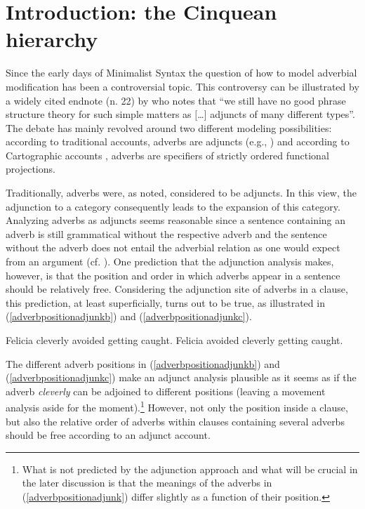 \section{Introduction: the Cinquean hierarchy}\label{introcinque}
Since the early days of Minimalist Syntax the question of how to model adverbial modification has been a controversial topic. This controversy can be illustrated by a widely cited endnote (n. 22) by \citet[382]{chomsky1995categories} who notes that ``we still have no good phrase structure theory for such simple matters as $[$\dots $]$ adjuncts of many different types''. The debate has mainly revolved around two different modeling possibilities: according to traditional accounts, adverbs are adjuncts (e.g., \citealt{travis1988syntax, potsdam1999syntax, ernst2004principles, vanvalin2005exploring}) and according to Cartographic accounts \citep{cinque1999adverbs, cinque2006restructuring}, adverbs are specifiers of strictly ordered functional projections. 

Traditionally, adverbs were, as noted, considered to be adjuncts. In this view, the adjunction to a category consequently leads to the expansion of this category. Analyzing adverbs as adjuncts seems reasonable since a sentence containing an adverb is still grammatical without the respective adverb and the sentence without the adverb does not entail the adverbial relation as one would expect from an argument (cf.  \citealt{hole2015arguments}).  One prediction that the adjunction analysis makes, however, is that the position and order in which adverbs appear in a sentence should be relatively free. Considering the adjunction site of adverbs in a clause, this prediction, at least superficially, turns out to be true, as illustrated in (\ref{adverbpositionadjunkb}) and (\ref{adverbpositionadjunkc}).

\begin{exe} 
\ex \label{adverbpositionadjunk}\begin{xlist} 
\ex Felicia cleverly avoided getting caught. \label{adverbpositionadjunkb} %
\ex Felicia avoided cleverly getting caught.\label{adverbpositionadjunkc} %
\end{xlist} 
\end{exe}

\noindent The different adverb positions in (\ref{adverbpositionadjunkb}) and (\ref{adverbpositionadjunkc}) make an adjunct analysis plausible as it seems as if the adverb \textit{cleverly} can be adjoined to different positions (leaving a movement analysis aside for the moment).\footnote{ What is not predicted by the adjunction approach and what will be crucial in the later discussion is that the meanings of the adverbs in (\ref{adverbpositionadjunk}) differ slightly as a function of their position.} However, not only the position inside a clause, but also the relative order of adverbs within clauses containing several adverbs should be free according to an adjunct account. 

